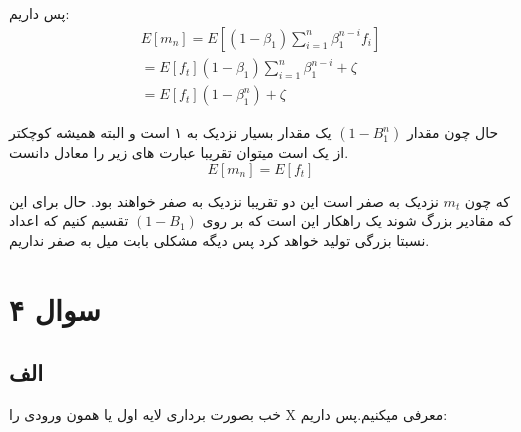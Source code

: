 \documentclass{article}[12pt]
\begin{document}
پس داریم:
\begin{gather*}
		E\left[m_{n}\right]=E\left[\left(1-\beta_{1}\right) \sum_{i=1}^{n} \beta_{1}^{n-i} f_{i}\right] \\
		=E\left[f_{t}\right]\left(1-\beta_{1}\right) \sum_{i=1}^{n} \beta_{1}^{n-i}+\zeta \\
		=E\left[f_{t}\right]\left(1-\beta_{1}^{n}\right)+\zeta
\end{gather*}

حال چون مقدار 
$(1-B_1^n)$
یک مقدار بسیار نزدیک به ۱ است و البته همیشه کوچکتر از یک است میتوان تقریبا عبارت های زیر را معادل دانست.
$$
E[m_n] = E[f_t]
$$

که چون 
$m_t$
نزدیک به صفر است این دو تقریبا نزدیک به صفر خواهند بود. حال برای این که مقادیر بزرگ شوند یک راهکار این است که بر روی 
$(1-B_1)$
تقسیم کنیم که اعداد نسبتا بزرگی تولید خواهد کرد پس دیگه مشکلی بابت میل به صفر نداریم.
\section{سوال ۴}
\subsection{الف}
خب بصورت برداری لایه اول یا همون ورودی را X معرفی میکنیم.پس داریم:
\end{document}
